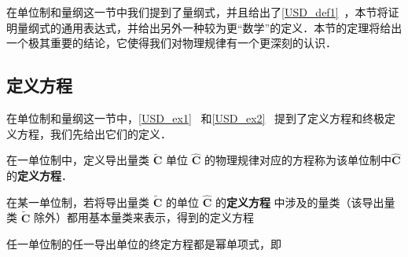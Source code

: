 
在单位制和量纲这一节中我们提到了量纲式，并且给出了\autoref{USD_def1}~，本节将证明量纲式的通用表达式，并给出另外一种较为更“数学”的定义．本节的定理将给出一个极其重要的结论，它使得我们对物理规律有一个更深刻的认识．
\subsection{定义方程}
在单位制和量纲这一节中，\autoref{USD_ex1}~ 和\autoref{USD_ex2}~ 提到了定义方程和终极定义方程，我们先给出它们的定义．
\begin{definition}{}
在一单位制中，定义导出量类 $\tilde{\boldsymbol{C}}$ 单位 $\hat{\boldsymbol{C}}$ 的物理规律对应的方程称为该单位制中$\hat{\boldsymbol{C}}$ 的\textbf{定义方程}．
\end{definition}
\begin{definition}{}
在某一单位制，若将导出量类 $\tilde{\boldsymbol{C}}$ 的单位 $\hat{\boldsymbol{C}}$ 的\textbf{定义方程} 中涉及的量类（该导出量类 $\tilde{\boldsymbol{C}}$ 除外）都用基本量类来表示，得到的定义方程称\t
\end{definition}

\begin{theorem}{}
任一单位制的任一导出单位的终定方程都是幂单项式，即
\end{theorem}